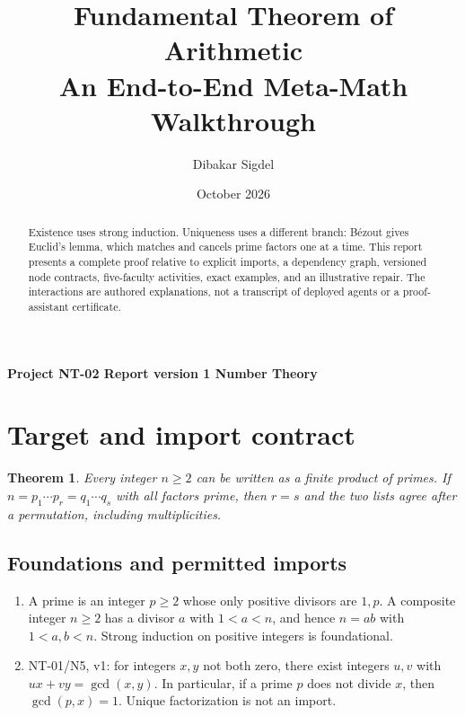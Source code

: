 \documentclass[preprint,12pt,aps,pra,showkeys,amsmath,amssymb,superscriptaddress,floatfix]{revtex4-2}
\newtheorem{theorem}{Theorem}[section]
\theoremstyle{definition}
\theoremstyle{remark}
\begin{document}
\title{Fundamental Theorem of Arithmetic\\[4pt]\large An End-to-End Meta-Math Walkthrough}

\author{Dibakar Sigdel}


\date{October 2026}

\begin{abstract}

Existence uses strong induction. Uniqueness uses a different branch:
Bézout gives Euclid's lemma, which matches and cancels prime factors one
at a time. This report presents a complete proof relative to explicit
imports, a dependency graph, versioned node contracts, five-faculty
activities, exact examples, and an illustrative repair. The interactions
are authored explanations, not a transcript of deployed agents or a
proof-assistant certificate.

\end{abstract}

\maketitle

\linespread{1.12}\selectfont

\noindent\textbf{Project NT-02 \quad Report version 1 \quad Number Theory}

\section{Target and import contract}

\begin{theorem}

Every integer \(n\ge2\) can be written as a finite product of primes. If
\(n=p_1\cdots p_r=q_1\cdots q_s\) with all factors prime, then \(r=s\)
and the two lists agree after a permutation, including multiplicities.

\end{theorem}

\subsection{Foundations and permitted imports}

\begin{enumerate}
\def\labelenumi{\arabic{enumi}.}
\item
  A prime is an integer \(p\ge2\) whose only positive divisors are
  \(1,p\). A composite integer \(n\ge2\) has a divisor \(a\) with
  \(1<a<n\), and hence \(n=ab\) with \(1<a,b<n\). Strong induction on
  positive integers is foundational.
\item
  NT-01/N5, v1: for integers \(x,y\) not both zero, there exist integers
  \(u,v\) with \(ux+vy=\gcd(x,y)\). In particular, if a prime \(p\) does
  not divide \(x\), then \(\gcd(p,x)=1\). Unique factorization is not an
  import.
\end{enumerate}
\end{document}

